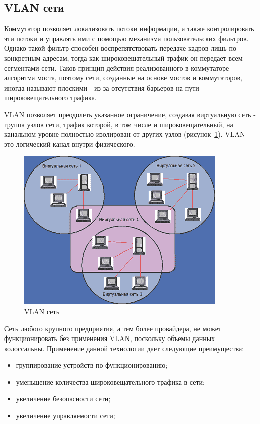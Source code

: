 \subsection{VLAN сети}
Коммутатор позволяет локализовать потоки информации, а также контролировать эти потоки и управлять ими с помощью механизма пользовательских фильтров. Однако такой фильтр способен воспрепятствовать передаче кадров лишь по конкретным адресам, тогда как широковещательный трафик он передает всем сегментами сети. Таков принцип действия реализованного в коммутаторе алгоритма моста, поэтому сети, созданные на основе мостов и коммутаторов, иногда называют плоскими - из-за отсутствия барьеров на пути широковещательного трафика.

VLAN позволяет преодолеть указанное ограничение, создавая виртуальную сеть - группа узлов сети, трафик которой, в том числе и широковещательный, на канальном уровне полностью изолирован от других узлов (рисунок~\ref{pic:vlan_net_example}). VLAN - это логический канал внутри физического.
\begin{figure}
\centering
\includegraphics[scale=0.55]{pictures/vlan_net_example}
\caption{VLAN сеть}
\label{pic:vlan_net_example}
\end{figure}

Сеть любого крупного предприятия, а тем более провайдера, не может функционировать без применения VLAN, поскольку объемы данных колоссальны. Применение данной технологии дает следующие преимущества:
\begin{itemize}
\item группирование устройств по функционированию;
\item уменьшение количества широковещательного трафика в сети;
\item увеличение безопасности сети;
\item увеличение управляемости сети;
\end{itemize}

